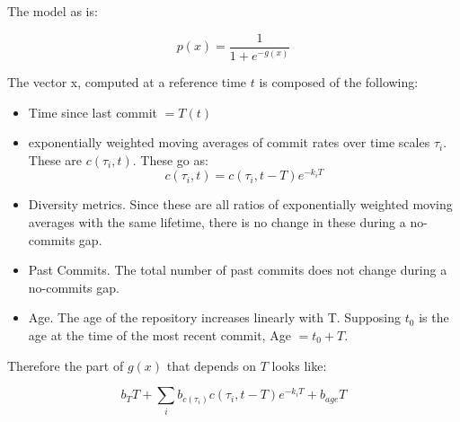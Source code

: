 \documentclass{article}
\begin{document}
The model as is:

\begin{displaymath}
p(x) = \frac{1}{1+e^{-g(x)}}
\end{displaymath}

The vector x, computed at a reference time $t$ is composed of the following:

\begin{itemize}
\item Time since last commit $= T(t)$

\item exponentially weighted moving averages of commit rates over time scales $\tau_i$. These are $c(\tau_i, t)$. These go as:
\begin{displaymath}
c(\tau_i, t ) = c(\tau_i, t - T) e^{-k_i T}
\end{displaymath}

\item Diversity metrics. Since these are all ratios of exponentially weighted moving averages with the same lifetime, there is no change in these during a no-commits gap.

\item Past Commits. The total number of past commits does not change during a no-commits gap.

\item Age. The age of the repository increases linearly with T. Supposing $t_0$ is the age at the time of the most recent commit, Age $= t_0 + T$. 

\end{itemize}

Therefore the part of $g(x)$ that depends on $T$ looks like:

\begin{displaymath}
b_{T}T + \sum_i b_{c(\tau_i)} c(\tau_i, t-T) e^{-k_i T} + b_{age}T
\end{displaymath}
\end{document}
